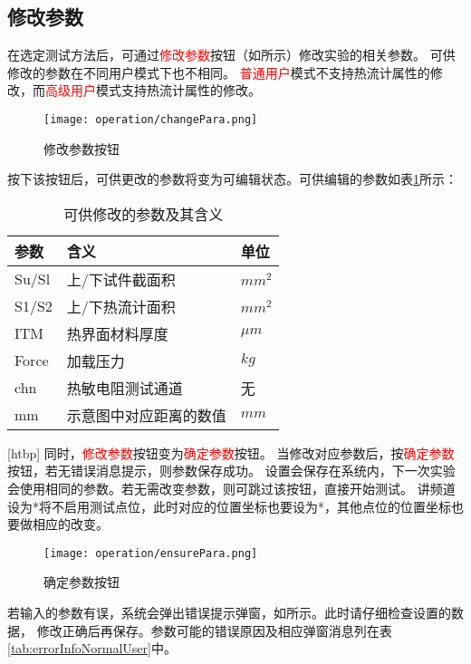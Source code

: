 \subsection{修改参数}
在选定测试方法后，可通过\textcolor{red}{修改参数}按钮（如所示）修改实验的相关参数。
可供修改的参数在不同用户模式下也不相同。
\textcolor{red}{普通用户}模式不支持热流计属性的修改，而\textcolor{red}{高级用户}模式支持热流计属性的修改。
\begin{figure}[H]
    \centering
    \texttt{[image: operation/changePara.png]}
    \caption{ 修改参数按钮 \label{fig:btnChangePara}}
\end{figure}
按下该按钮后，可供更改的参数将变为可编辑状态。可供编辑的参数如表\ref{tab:editableParaNormalUser}所示：
\begin{table}
    \centering
    \caption{ 可供修改的参数及其含义 \label{tab:editableParaNormalUser}}
    \begin{tabular}{@{}lll@{}}
        \toprule
        参数  & 含义                   & 单位    \\ \midrule
        Su/Sl & 上/下试件截面积        & $mm^2$  \\
        S1/S2 & 上/下热流计面积        & $mm^2$  \\
        ITM   & 热界面材料厚度         & $\mu m$ \\
        Force & 加载压力               & $kg$    \\
        chn   & 热敏电阻测试通道       & 无      \\
        mm    & 示意图中对应距离的数值 & $mm$    \\ \bottomrule
    \end{tabular}
\end{table}[htbp]
同时，\textcolor{red}{修改参数}按钮变为\textcolor{red}{确定参数}按钮。
当修改对应参数后，按\textcolor{red}{确定参数}按钮，若无错误消息提示，则参数保存成功。
设置会保存在系统内，下一次实验会使用相同的参数。若无需改变参数，则可跳过该按钮，直接开始测试。
讲频道设为*将不启用测试点位，此时对应的位置坐标也要设为*，其他点位的位置坐标也要做相应的改变。
\begin{figure}[H]
    \centering
    \texttt{[image: operation/ensurePara.png]}
    \caption{ 确定参数按钮 \label{fig:ensurePara}}
\end{figure}

\begin{note}
    若输入的参数有误，系统会弹出错误提示弹窗，如所示。此时请仔细检查设置的数据，
    修改正确后再保存。参数可能的错误原因及相应弹窗消息列在表\ref{tab:errorInfoNormalUser}中。
\end{note}

